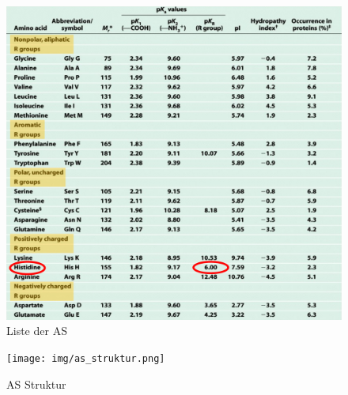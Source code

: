 \documentclass[a4paper,twocolumn,usegeometry,english,fontsize=6,DIV=16]{scrartcl}
\begin{document}
\begin{figure}
	\centering
	\includegraphics[width=0.8\linewidth]{img/as_liste.png}
	\caption{Liste der AS}
\end{figure}

\begin{figure}
	\centering
	\texttt{[image: img/as\_struktur.png]}
	\caption{AS Struktur}
\end{figure}
\end{document}
